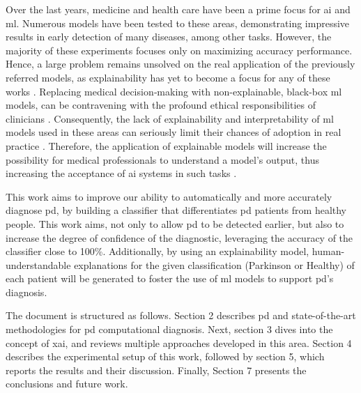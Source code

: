 Over the last years, medicine and health care have been a prime focus for \gls{ai} and \gls{ml}. Numerous models have been tested to these areas, demonstrating impressive results in early detection of many diseases, among other tasks. However, the majority of these experiments focuses only on maximizing accuracy performance. Hence, a large problem remains unsolved on the real application of the previously referred models, as explainability has yet to become a focus for any of these works \cite{LIME_explainability}.
Replacing medical decision‐making with non-explainable, black-box \gls{ml} models, can be contravening with the profound ethical responsibilities of clinicians \cite{black_box_model_problem}. Consequently, the lack of explainability and interpretability of \gls{ml} models used in these areas can seriously limit their chances of adoption in real practice \cite{interpretability_importance}. Therefore, the application of explainable models will increase the possibility for medical professionals to understand a model's output, thus increasing the acceptance of \gls{ai} systems in such tasks \cite{explainable_ai_systems}.

This work aims to improve our ability to automatically and more accurately diagnose \gls{pd}, by building a classifier that differentiates \gls{pd} patients from healthy people. This work aims, not only to allow \gls{pd} to be detected earlier, but also to increase the degree of confidence of the diagnostic, leveraging the accuracy of the classifier close to 100\%. Additionally, by using an explainability model, human-understandable explanations for the given classification (Parkinson or Healthy) of each patient will be generated to foster the use of \gls{ml} models to support \gls{pd}'s diagnosis.

The document is structured as follows. Section 2 describes \gls{pd} and state-of-the-art methodologies for \gls{pd} computational diagnosis. Next, section 3 dives into the concept of \gls{xai}, and reviews multiple approaches developed in this area. Section 4 describes the experimental setup of this work, followed by section 5, which reports the results and their discussion. Finally, Section 7 presents the conclusions and future work.


